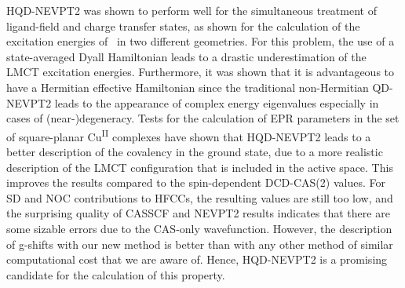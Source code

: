 HQD-NEVPT2 was shown to perform well for the simultaneous treatment of ligand-field and charge transfer states, as shown for the calculation of the excitation energies of \CuCl\ in two different geometries. For this problem, the use of a state-averaged Dyall Hamiltonian leads to a drastic underestimation of the LMCT excitation energies. Furthermore, it was shown that it is advantageous to have a Hermitian effective Hamiltonian since the traditional non-Hermitian QD-NEVPT2 leads to the appearance of complex energy eigenvalues especially in cases of (near-)degeneracy.
Tests for the calculation of EPR parameters in the set of square-planar Cu\textsuperscript{II} complexes have shown that HQD-NEVPT2 leads to a better description of the covalency in the ground state, due to a more realistic description of the LMCT configuration that is included in the active space. This improves the results compared to the spin-dependent DCD-CAS(2) values. For SD and NOC contributions to HFCCs, the resulting values are still too low, and the surprising quality of CASSCF and NEVPT2 results indicates that there are some sizable errors due to the CAS-only wavefunction. However, the description of g-shifts with our new method is better than with any other method of similar computational cost that we are aware of. Hence, HQD-NEVPT2 is a promising candidate for the calculation of this property.

